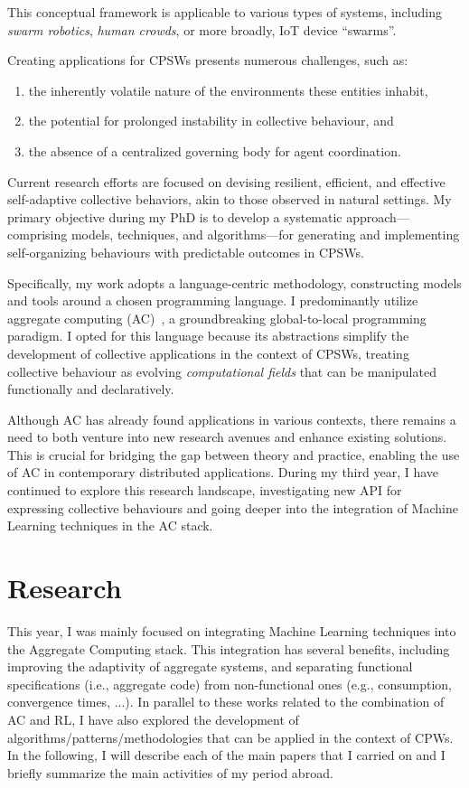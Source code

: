 \documentclass[11pt]{article}
\begin{document}
This conceptual framework is applicable to various types of systems, 
 including \textit{swarm robotics}, \textit{human crowds}, or more broadly, IoT device ``swarms''.

Creating applications for CPSWs presents numerous challenges, such as:
\begin{enumerate}
\item the inherently volatile nature of the environments these entities inhabit,
\item the potential for prolonged instability in collective behaviour, and
\item the absence of a centralized governing body for agent coordination.
\end{enumerate}

Current research efforts are focused on devising resilient, 
 efficient, and effective self-adaptive collective behaviors, 
 akin to those observed in natural settings. 
% 
My primary objective during my PhD is to develop a systematic approach—comprising models, 
 techniques, and algorithms—for generating and implementing self-organizing behaviours with predictable outcomes in CPSWs.

Specifically, my work adopts a language-centric methodology, constructing models and tools around a chosen programming language. I
 predominantly utilize aggregate computing (AC)~\cite{beal2015aggregate}, 
 a groundbreaking global-to-local programming paradigm. 
%
I opted for this language because its abstractions simplify the development of collective applications in the context of CPSWs, treating collective behaviour as evolving \textit{computational fields} that can be manipulated functionally and declaratively.

Although AC has already found applications in various contexts, 
 there remains a need to both venture into new research avenues and enhance existing solutions. 
 This is crucial for bridging the gap between theory and practice, enabling the use of AC in contemporary distributed applications. During my third year, I have continued to explore this research landscape, 
 investigating new API for expressing collective behaviours and going deeper into the integration of Machine Learning techniques in the AC stack.
\section{Research}

This year, 
 I was mainly focused on integrating Machine Learning techniques into the Aggregate Computing stack.
%
This integration has several benefits, 
 including improving the adaptivity of aggregate systems, 
 and separating functional specifications (i.e., aggregate code) from non-functional ones (e.g., consumption, convergence times, ...).
%
In parallel to these works related to the combination of AC and RL, 
 I have also explored the development of algorithms/patterns/methodologies 
 that can be applied in the context of CPWs.
In the following, I will describe each of the main papers that I carried on
 and I briefly summarize the main activities of my period abroad.
\end{document}
